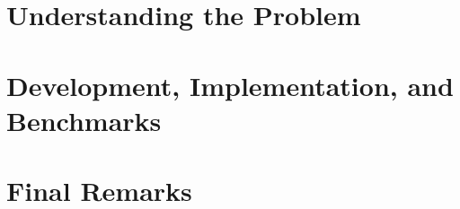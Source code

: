 



\frontmatter

\begin{titlingpage}
  \maketitle
\end{titlingpage}


\pagebreak

\tableofcontents*

\mainmatter
{}



\part{Understanding the Problem}



\part{Development, Implementation, and Benchmarks}




\part{Final Remarks}


\backmatter


\nocite{*}




